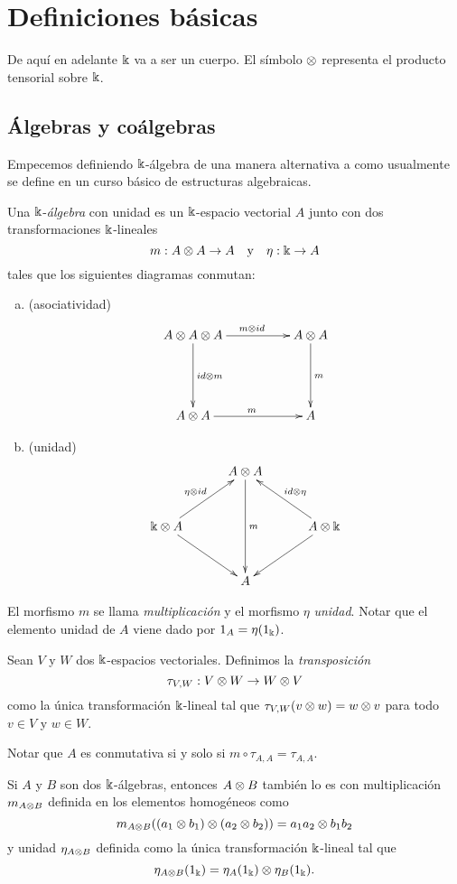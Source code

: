 \documentclass[a4paper,oneside,fleqn,11pt,../tesis.tex]{subfiles}
\begin{document}
\section{Definiciones básicas}
De aquí en adelante $\Bbbk$ va a ser un cuerpo. El símbolo $\otimes$ representa el producto tensorial
sobre $\Bbbk$. \cite{A}

\subsection{Álgebras y coálgebras}

Empecemos definiendo $\Bbbk$-álgebra de una manera alternativa a como usualmente se define en un
curso básico de estructuras algebraicas.

\begin{definition}\label{defalgebra} Una $\Bbbk$-\emph{álgebra} con unidad es un $\Bbbk$-espacio vectorial $A$ junto con dos
transformaciones $\Bbbk$-lineales
\[
	m: A \otimes A \to A \quad\text{y}\quad \eta: \Bbbk \to A
\]
tales que los siguientes diagramas conmutan:
\begin{enumerate}[(a)]
\item (asociatividad)
\begin{align*}
\xymatrix@=5em{
	A \ox A \ox A \ar[r]^{m \ox id} \ar[d]^{id \ox m} & A \ox A \ar[d]^{m} \\
	A \ox A \ar[r]^{m} & A
}
\end{align*}
\item (unidad)
\begin{align*}
\xymatrix@=3em{
	& A \ox A \ar[dd]^{m} & \\
	\field \ox A \ar[ur]^{\eta \ox id} \ar[dr] & & A \ox \field \ar[ul]_{id \ox \eta} \ar[dl] \\
	& A &
}
\end{align*}
\end{enumerate}
El morfismo $m$ se llama \emph{multiplicación} y el morfismo $\eta$ \emph{unidad}. 
Notar que el elemento unidad de $A$ viene dado por $1_{A} = \eta(1_{\Bbbk})$.
\end{definition}

\begin{definition}
	Sean $V$ y $W$ dos $\Bbbk$-espacios vectoriales. Definimos la \emph{transposición}
	\[
		\tau_{V,W}: V \otimes W \to W \otimes V
	\]
	como la única transformación $\Bbbk$-lineal tal que
	$\tau_{V,W}(v \otimes w) = w \otimes v$ para todo $v \in V$ y $w \in W$.
\end{definition}

Notar que $A$ es conmutativa si y solo si $m \circ \tau_{A, A} = \tau_{A, A}$.
\begin{obs}
	Si $A$ y $B$ son dos $\Bbbk$-álgebras, entonces $A \otimes B$
	también lo es con multiplicación $m_{A \otimes B}$ definida en los elementos homogéneos como
	\[
		m_{A \otimes B} ((a_1 \otimes b_1) \otimes (a_2 \otimes b_2)) = a_1 a_2 \otimes b_1 b_2
	\]
	y unidad $\eta_{A \otimes B}$ definida como la única transformación $\Bbbk$-lineal tal que
	\[
		\eta_{A \otimes B}(1_{\Bbbk}) = \eta_A(1_{\Bbbk}) \otimes \eta_B(1_{\Bbbk}).
	\]
\end{obs}
\end{document}
